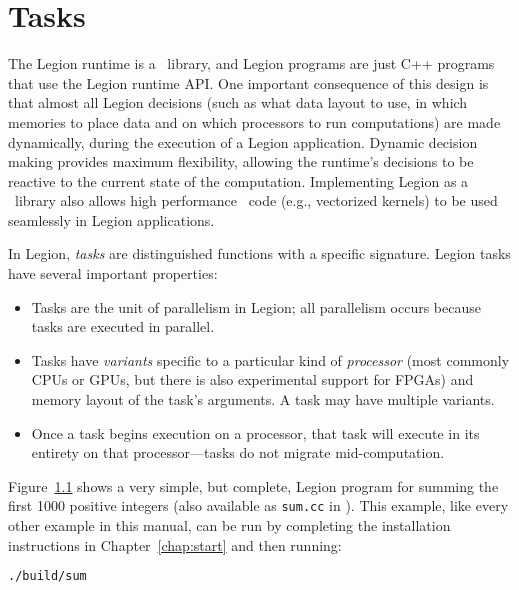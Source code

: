 \chapter{Tasks}
\label{chap:tasks}

The Legion runtime is a \Cpp\ library, and
Legion programs are just C++ programs that use the Legion runtime API.
One important consequence of this design is that almost all Legion decisions
(such as what data layout to use, in which memories to place data and on which
processors to run computations) are made dynamically,  during the execution of 
a Legion application.  Dynamic decision making provides maximum flexibility, 
allowing the runtime's decisions to be reactive to the current state of the computation.
Implementing Legion as a \Cpp\ library also allows high performance \Cpp\ code
(e.g., vectorized kernels) to be used seamlessly in Legion applications.

In Legion, {\em tasks} are distinguished functions with a specific signature.
Legion tasks have several important properties:
\begin{itemize}
\item Tasks are the unit of parallelism in Legion; all parallelism occurs because tasks are executed in parallel.

\item Tasks have {\em variants} specific to a particular kind of {\em processor} (most commonly CPUs or GPUs, but there is also experimental support for FPGAs) and 
memory layout of the task's arguments.  A task may have multiple variants.

\item Once a task begins execution on a processor, that task will execute in its entirety on that processor---tasks do
not migrate mid-computation.  

\end{itemize}

\begin{figure}

\caption{}
\label{fig:simple}
\end{figure}

Figure~\ref{fig:simple} shows a very simple, but complete, Legion program for summing
the first 1000 positive integers (also available as {\tt sum.cc} in ).
This example, like every other example in this manual, can be run by completing the installation instructions in Chapter~\ref{chap:start} and then running:
\begin{lstlisting}[language=bash,style=inline]
./build/sum
\end{lstlisting}

